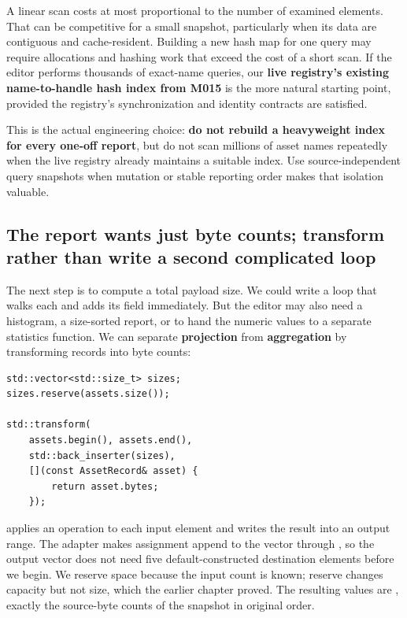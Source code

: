 A linear scan costs at most proportional to the number of examined elements. That can be competitive for a small snapshot, particularly when its data are contiguous and cache-resident. Building a new hash map for one query may require allocations and hashing work that exceed the cost of a short scan. If the editor performs thousands of exact-name queries, our \textbf{live registry's existing name-to-handle hash index from M015} is the more natural starting point, provided the registry's synchronization and identity contracts are satisfied.

This is the actual engineering choice: \textbf{do not rebuild a heavyweight index for every one-off report}, but do not scan millions of asset names repeatedly when the live registry already maintains a suitable index. Use source-independent query snapshots when mutation or stable reporting order makes that isolation valuable.

\subsection{The report wants just byte counts; transform rather than write a second complicated loop}\label{01-foundations-i-ch006-the-report-wants-just-byte-counts-transform-rather-than-write-a-second-complicated-loop}

\hypertarget{01-foundations-i-ch006-the-report-wants-just-byte-counts-transform-rather-than-write-a-second-complicated-loop}{}

The next step is to compute a total payload size. We could write a loop that walks each  and adds its  field immediately. But the editor may also need a histogram, a size-sorted report, or to hand the numeric values to a separate statistics function. We can separate \textbf{projection} from \textbf{aggregation} by transforming records into byte counts:

\begin{verbatim}
std::vector<std::size_t> sizes;
sizes.reserve(assets.size());

std::transform(
    assets.begin(), assets.end(),
    std::back_inserter(sizes),
    [](const AssetRecord& asset) {
        return asset.bytes;
    });
\end{verbatim}

 applies an operation to each input element and writes the result into an output range. The  adapter makes assignment append to the vector through , so the output vector does not need five default-constructed destination elements before we begin. We reserve space because the input count is known; reserve changes capacity but not size, which the earlier chapter proved. The resulting values are \BookInlineCode{{{[}}{4}{8}{,}{6}{4}{,}{1}{6}{,}{1}{2}{8}{,}{4}{8}{{]}}}{{[}48,64,16,128,48{]}}, exactly the source-byte counts of the snapshot in original order.

